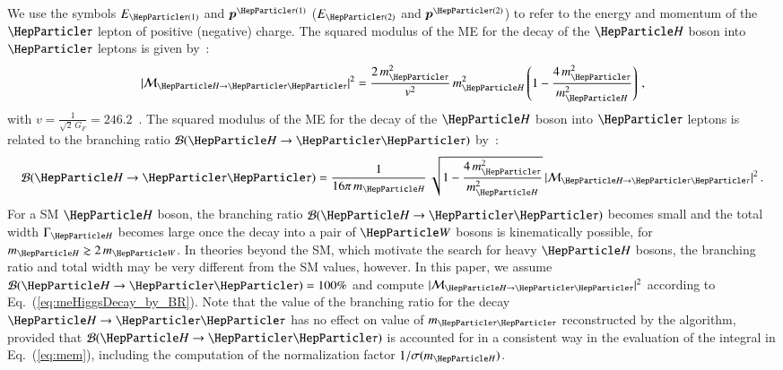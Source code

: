 We use the symbols $E_{\Pgt(1)}$ and $\bm{p}^{\Pgt(1)}$ ($E_{\Pgt(2)}$ and $\bm{p}^{\Pgt(2)}$) to refer to
the energy and momentum of the $\Pgt$ lepton of positive (negative) charge.
The squared modulus of the ME for the decay of the $\PHiggs$ boson
into $\Pgt$ leptons is given by~\cite{me_HtoTauTau}:
\begin{equation}
\vert \mathcal{M}_{\PHiggs \to \Pgt\Pgt} \vert^{2} = 
 \frac{2 \, m_{\Pgt}^{2}}{v^{2}} \, m_{\PHiggs}^{2} \left( 1 - \frac{4 \, m_{\Pgt}^{2}}{m_{\PHiggs}^{2}} \right) \, ,
\label{eq:meHiggsDecay}
\end{equation}
with $v = \frac{1}{\sqrt{2} \, G_{F}} = 246.2$~\GeV.
The squared modulus of the ME for the decay of the $\PHiggs$ boson
into $\Pgt$ leptons is related to the branching ratio $\mathcal{B}(\PHiggs \to \Pgt\Pgt)$
by~\cite{me_HtoTauTau}:
\begin{equation}
\mathcal{B}(\PHiggs \to \Pgt\Pgt) 
 = \frac{1}{16\pi \, m_{\PHiggs}} \, \sqrt{1 - \frac{4 \, m_{\Pgt}^{2}}{m_{\PHiggs}^{2}}} \, \vert \mathcal{M}_{\PHiggs \to \Pgt\Pgt} \vert^{2} \, .
\label{eq:meHiggsDecay_by_BR}
\end{equation}
For a SM $\PHiggs$ boson,
the branching ratio $\mathcal{B}(\PHiggs \to \Pgt\Pgt)$ becomes small and the total width $\Gamma_{\PHiggs}$ becomes large
once the decay into a pair of $\PW$ bosons is kinematically possible,
\ie for $m_{\PHiggs} \gtrsim 2 \, m_{\PW}$.
In theories beyond the SM, which motivate the search for heavy $\PHiggs$ bosons,
the branching ratio and total width may be very different from the SM
values, however.
In this paper, we assume $\mathcal{B}(\PHiggs \to \Pgt\Pgt) = 100\%$ and compute $\vert \mathcal{M}_{\PHiggs \to \Pgt\Pgt} \vert^{2}$ according to Eq.~(\ref{eq:meHiggsDecay_by_BR}).
Note that the value of the branching ratio for the decay $\PHiggs \to \Pgt\Pgt$ 
has no effect on value of $m_{\Pgt\Pgt}$ reconstructed by the algorithm, 
provided that $\mathcal{B}(\PHiggs \to \Pgt\Pgt)$ is accounted for in
a consistent way in the evaluation of the integral in
Eq.~(\ref{eq:mem}), including the computation of the normalization factor $1/\sigma(m_{\PHiggs})$.

